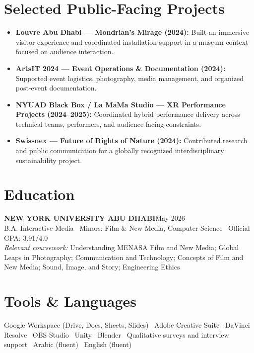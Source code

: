 \documentclass[letterpaper,10pt]{article}
\begin{document}
\section{Selected Public-Facing Projects}
\begin{itemize}
  \item \textbf{Louvre Abu Dhabi --- Mondrian's Mirage (2024):} Built an immersive visitor experience and coordinated installation support in a museum context focused on audience interaction.
  \item \textbf{ArtsIT 2024 --- Event Operations \& Documentation (2024):} Supported event logistics, photography, media management, and organized post-event documentation.
  \item \textbf{NYUAD Black Box / La MaMa Studio --- XR Performance Projects (2024--2025):} Coordinated hybrid performance delivery across technical teams, performers, and audience-facing constraints.
  \item \textbf{Swissnex --- Future of Rights of Nature (2024):} Contributed research and public communication for a globally recognized interdisciplinary sustainability project.
\end{itemize}

\section{Education}
\noindent\textbf{NEW YORK UNIVERSITY ABU DHABI}\hfill May 2026\\
B.A. Interactive Media \textbar\ Minors: Film \& New Media, Computer Science \textbar\ Official GPA: 3.91/4.0\\
\textit{Relevant coursework:} Understanding MENASA Film and New Media; Global Leaps in Photography; Communication and Technology; Concepts of Film and New Media; Sound, Image, and Story; Engineering Ethics

\section{Tools \& Languages}
Google Workspace (Drive, Docs, Sheets, Slides) \textbar\ Adobe Creative Suite \textbar\ DaVinci Resolve \textbar\ OBS Studio \textbar\ Unity \textbar\ Blender \textbar\ Qualitative surveys and interview support \textbar\ Arabic (fluent) \textbar\ English (fluent)
\end{document}
